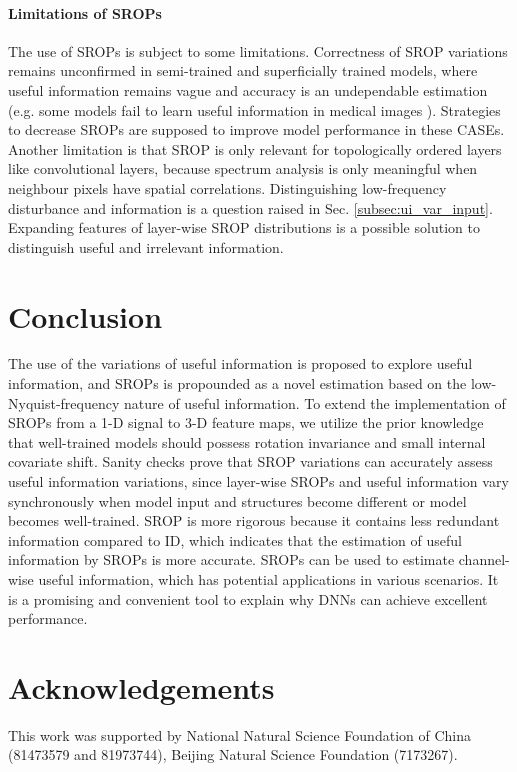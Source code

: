 \documentclass{article}
\begin{document}
\paragraph{Limitations of SROPs}
The use of SROPs is subject to some limitations. Correctness of SROP variations remains unconfirmed in semi-trained and superficially trained models, where useful information remains vague and accuracy is an undependable estimation (e.g. some models fail to learn useful information in medical images \cite{med_image}). Strategies to decrease SROPs are supposed to improve model performance in these CASEs. Another limitation is that SROP is only relevant for topologically ordered layers like convolutional layers, because spectrum analysis is only meaningful when neighbour pixels have spatial correlations. Distinguishing low-frequency disturbance and information is a question raised in Sec. \ref{subsec:ui_var_input}. Expanding features of layer-wise SROP distributions is a possible solution to distinguish useful and irrelevant information.

\section{Conclusion}\label{sec:conclusion}
The use of the variations of useful information is proposed to explore useful information, and SROPs is propounded as a novel estimation based on the low-Nyquist-frequency nature of useful information. To extend the implementation of SROPs from a 1-D signal to 3-D feature maps, we utilize the prior knowledge that well-trained models should possess rotation invariance and small internal covariate shift. Sanity checks prove that SROP variations can accurately assess useful information variations, since layer-wise SROPs and useful information vary synchronously when model input and structures become different or model becomes well-trained. SROP is more rigorous because it contains less redundant information compared to ID, which indicates that the estimation of useful information by SROPs is more accurate. SROPs can be used to estimate channel-wise useful information, which has potential applications in various scenarios. It is a promising and convenient tool to explain why DNNs can achieve excellent performance.
\section*{Acknowledgements}  
This work was supported by National Natural Science Foundation of China (81473579 and 81973744), Beijing Natural Science Foundation (7173267).
\end{document}
